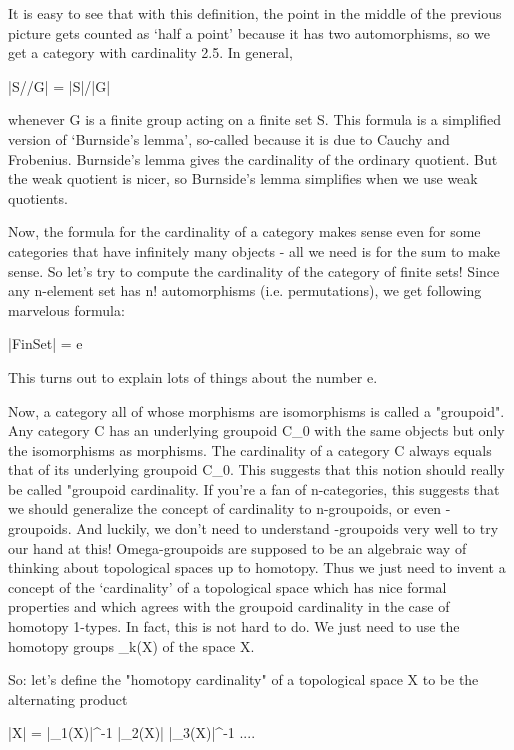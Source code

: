 It is easy to see that with this definition, the point in the middle
of the previous picture gets counted as `half a point' because it has
two automorphisms, so we get a category with cardinality 2.5.  In general,

                        |S//G| = |S|/|G|    

whenever G is a finite group acting on a finite set S.  This formula 
is a simplified version of `Burnside's lemma', so-called because it
is due to Cauchy and Frobenius.  Burnside's lemma gives the cardinality 
of the ordinary quotient.   But the weak quotient is nicer, so Burnside's
lemma simplifies when we use weak quotients.
 
Now, the formula for the cardinality of a category makes sense even
for some categories that have infinitely many objects - all we need is
for the sum to make sense.  So let's try to compute the cardinality
of the category of finite sets!   Since any n-element set has n! 
automorphisms (i.e. permutations), we get following marvelous formula:

                          |FinSet| = e 

This turns out to explain lots of things about the number e.  

Now, a category all of whose morphisms are isomorphisms is called
a "groupoid".  Any category C has an underlying groupoid 
C_{0} with the
same objects but only the isomorphisms as morphisms.  The cardinality 
of a category C always equals that of its underlying groupoid C_{0}.   
This suggests that this notion should really be called "groupoid 
cardinality.   If you're a fan of n-categories, this suggests that 
we should generalize the concept of cardinality to n-groupoids, or 
even \omega -groupoids.   And luckily, we don't need to understand 
\omega -groupoids very well to try our hand at this!  Omega-groupoids 
are supposed to be an algebraic way of thinking about topological spaces 
up to homotopy.  Thus we just need to invent a concept of the `cardinality' 
of a topological space which has nice formal properties and which agrees 
with the groupoid cardinality in the case of homotopy 1-types.  In fact, 
this is not hard to do.  We just need to use the homotopy groups 
\pi _{k}(X) of the space X.  

So: let's define the "homotopy cardinality" of a 
topological space X to be the alternating product 

     |X|   =   |\pi _{1}(X)|^{-1}   
                |\pi _{2}(X)|   
|\pi _{3}(X)|^{-1} ....

